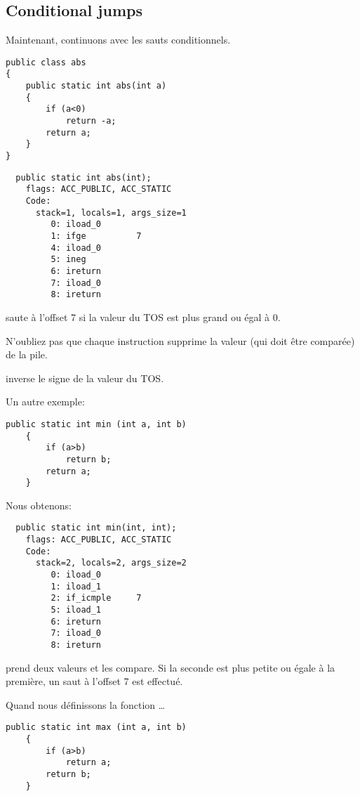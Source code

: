 \subsection{Conditional jumps}

Maintenant, continuons avec les sauts conditionnels.

\begin{lstlisting}[style=customjava]
public class abs
{
	public static int abs(int a)
	{
		if (a<0)
			return -a;
		return a;
	}
}
\end{lstlisting}

\begin{lstlisting}
  public static int abs(int);
    flags: ACC_PUBLIC, ACC_STATIC
    Code:
      stack=1, locals=1, args_size=1
         0: iload_0
         1: ifge          7
         4: iload_0
         5: ineg
         6: ireturn
         7: iload_0
         8: ireturn
\end{lstlisting}

 saute à l'offset 7 si la valeur du \ac{TOS} est plus grand ou égal à 0.

N'oubliez pas que chaque instruction  supprime la valeur (qui doit être
comparée) de la pile.


 inverse le signe de la valeur du \ac{TOS}.


Un autre exemple:

\begin{lstlisting}[style=customjava]
	public static int min (int a, int b)
	{
		if (a>b)
			return b;
		return a;
	}
\end{lstlisting}

Nous obtenons:

\begin{lstlisting}
  public static int min(int, int);
    flags: ACC_PUBLIC, ACC_STATIC
    Code:
      stack=2, locals=2, args_size=2
         0: iload_0
         1: iload_1
         2: if_icmple     7
         5: iload_1
         6: ireturn
         7: iload_0
         8: ireturn
\end{lstlisting}

 prend deux valeurs et les compare.
Si la seconde est plus petite ou égale à la première, un saut à l'offset 7 est effectué.


Quand nous définissons la fonction  \dots


\begin{lstlisting}[style=customjava]
	public static int max (int a, int b)
	{
		if (a>b)
			return a;
		return b;
	}
\end{lstlisting}

